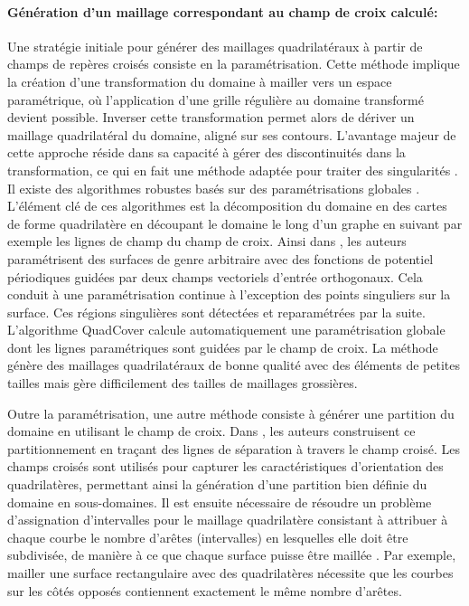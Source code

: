\paragraph{Génération d'un maillage correspondant au champ de croix calculé:}

Une stratégie initiale pour générer des maillages quadrilatéraux à partir de champs de repères croisés consiste en la paramétrisation. Cette méthode implique la création d'une transformation du domaine à mailler vers un espace paramétrique, où l'application d'une grille régulière au domaine transformé devient possible. Inverser cette transformation permet alors de dériver un maillage quadrilatéral du domaine, aligné sur ses contours. L'avantage majeur de cette approche réside dans sa capacité à gérer des discontinuités dans la transformation, ce qui en fait une méthode adaptée pour traiter des singularités \cite{reberol2018maillages}. Il existe des algorithmes robustes basés sur des paramétrisations globales \cite{ray2006periodic, kalberer2007quadcover, myles2014robust, campen2015quantized}. L'élément clé de ces algorithmes est la décomposition du domaine en des cartes de forme quadrilatère en découpant le domaine le long d'un graphe en suivant par exemple les lignes de champ du champ de croix. Ainsi dans \cite{ray2006periodic}, les auteurs paramétrisent des surfaces de genre arbitraire avec des fonctions de potentiel périodiques guidées par deux champs vectoriels d'entrée orthogonaux. Cela conduit à une paramétrisation continue à l'exception des points singuliers sur la surface. Ces régions singulières sont détectées et reparamétrées par la suite. L'algorithme QuadCover \cite{kalberer2007quadcover} calcule automatiquement une paramétrisation globale dont les lignes paramétriques sont guidées par le champ de croix. La méthode génère des maillages quadrilatéraux de bonne qualité avec des éléments de petites tailles mais gère difficilement des tailles de maillages grossières.

Outre la paramétrisation, une autre méthode consiste à générer une partition du domaine en utilisant le champ de croix.  Dans \cite{kowalski2013pde}, les auteurs construisent ce partitionnement en traçant des lignes de séparation à travers le champ croisé. Les champs croisés sont utilisés pour capturer les caractéristiques d'orientation des quadrilatères, permettant ainsi la génération d'une partition bien définie du domaine en sous-domaines. Il est ensuite nécessaire de résoudre un problème d'assignation d'intervalles pour le maillage quadrilatère consistant à attribuer à chaque courbe le nombre d'arêtes (intervalles) en lesquelles elle doit être subdivisée, de manière à ce que chaque surface  puisse être maillée \cite{hohring1997mesh, mitchell2000high, mitchell2014simple}. Par exemple, mailler une surface rectangulaire avec des quadrilatères nécessite que les courbes sur les côtés opposés contiennent exactement le même nombre d'arêtes.


